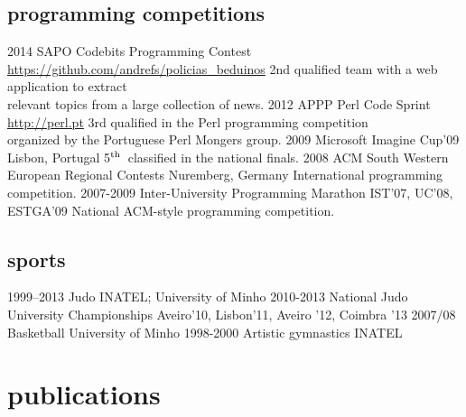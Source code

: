 \documentclass[a4paper]{friggeri-cv}
\begin{document}
\subsection{programming competitions}{}
\begin{entrylist}
  \entry
    {2014}
    {SAPO Codebits Programming Contest}
    {\href{https://github.com/andrefs/policias\_beduinos}{https://github.com/andrefs/policias\_beduinos}}
    {2nd qualified team with a web application to extract\\
    relevant topics from a large collection of news.}
    {}
  \entry
    {2012}
    {APPP Perl Code Sprint}
    {\href{http://perl.pt}{http://perl.pt}}
    {3rd qualified in the Perl programming competition\\organized by the Portuguese Perl Mongers group.}
    {}
  \entry
    {2009}
    {Microsoft Imagine Cup'09}
    {Lisbon, Portugal}
    {5$^{\footnotesize\textrm{th}}$~classified in the national finals.}
    {}
  \entry
    {2008}
    {ACM South Western European Regional Contests}
    {Nuremberg, Germany}
    {International programming competition.}
    {}
  \entry
    {2007-2009}
    {Inter-University Programming Marathon}
    {IST'07, UC'08, ESTGA'09}
    {National ACM-style programming competition.}
    {}
\end{entrylist}


\newpage
\subsection{sports}{}
\begin{entrylist}
  \entry
    {1999--2013}
    {Judo}
    {INATEL; University of Minho}
    {\vspace{-.8cm}}
    {}
  \entry
    {2010-2013}
    {National Judo University Championships}
    {Aveiro'10, Lisbon'11, Aveiro '12, Coimbra '13}
    {\vspace{-.8cm}}
    {}
  \entry
    {2007/08}
    {Basketball}
    {University of Minho}
    {\vspace{-.8cm}}
    {}
  \entry
    {1998-2000}
    {Artistic gymnastics}
    {INATEL}
    {}
    {}
\end{entrylist}

\section{publications}
\end{document}
